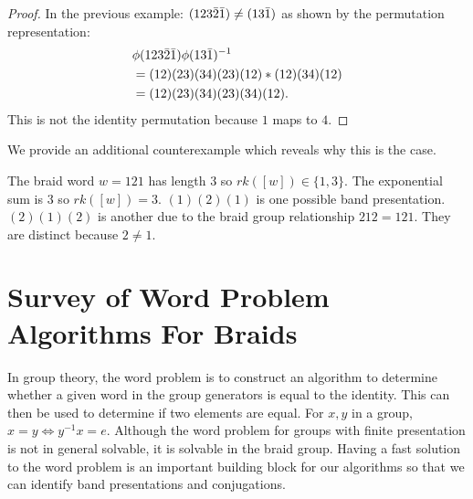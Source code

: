 \documentclass[12pt]{thesis}
\begin{document}
\begin{proof}
    In the previous example:
    $(1 2 3 \bar{2} \bar{1}) \neq (1 3 \bar{1})$ 
    as shown by the permutation representation:
    \[
        \begin{split}
        &\phi(1 2 3 \bar{2} \bar{1}) \phi( 1 3 \bar{1})^{-1} \\
        &=(12)(23)(34)(23)(12) * (12)(34)(12) \\
        &= (12) (23) (34) (23) (34) (12).
        \end{split}
    \]
    This is not the identity permutation because $1$ maps to $4$.
\end{proof}

We provide an additional counterexample which reveals why this is the case.
\begin{example}
    The braid word $w = 1 2 1$ has length 3 so $rk([w]) \in \{ 1, 3 \}$.
    The exponential sum is $3$ so $rk([w]) = 3$.
    $(1)(2)(1)$ is one possible band presentation.
    $(2)(1)(2)$ is another due to the braid group
    relationship $212 = 121$.
    They are distinct because $2 \neq 1$.
\end{example}

\chapter{Survey of Word Problem Algorithms For Braids}

\label{chap:word-problem}

In group theory, the word problem is
to construct an algorithm to determine whether a given word
in the group generators is equal
to the identity.
This can then be used to determine if two elements are equal.
For $x, y$ in a group, $x = y \Leftrightarrow y^{-1}x = e$.
Although the word problem for groups with finite presentation is not in general solvable,
it is solvable in the braid group.
Having a fast solution to the word problem is an important building block for our algorithms
so that we can identify band presentations
and conjugations.
\end{document}
